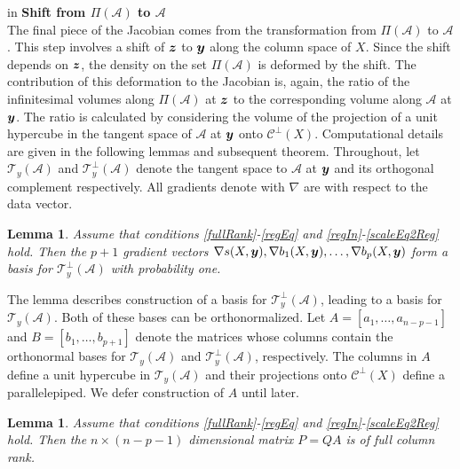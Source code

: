 \documentclass[12pt]{article}
\newcommand{\by}{\mbox{\boldmath $y$}}
\newcommand{\bz}{\mbox{\boldmath $z$}}
\newcommand{\mc}{\mathcal}
\newtheorem{lemma}[theorem]{\bf Lemma}
\begin{document}
 in
\noindent
{\bf Shift from $\Pi(\mathcal{A})$ to $\mathcal{A}$} \\
The final piece of the Jacobian comes from the transformation from
$\Pi(\mathcal{A})$ to $\mathcal{A}$.  %
This step involves a shift of
$\bz$ to $\by$ along the column space of $X$. Since the shift depends on 
$\bz$, the density on the set 
$\Pi(\mathcal{A})$ is deformed by the shift. The
contribution of this deformation to the Jacobian is, again,
the ratio of the infinitesimal volumes along $\Pi(\mathcal{A})$ at $\bz$ to the
corresponding volume along $\mathcal{A}$ at $\by$. 
The ratio is calculated by considering the volume of the
projection of a unit hypercube in the tangent space of $\mathcal{A}$
at $\by$ onto $\mc{C}^\perp(X)$.
Computational details are
given in the following lemmas and subsequent theorem. Throughout, let
$\mc T_{y}(\mc A)$ and $\mc T_{y}^{\perp}(\mc A)$ denote the tangent
space to $\mc A$ at $\by$ and its orthogonal complement respectively. All gradients denote with $\nabla$ are with respect to the data vector.
\begin{lemma}
\label{lem:basis}
Assume that conditions \ref{fullRank}-\ref{regEq} and \ref{regIn}-\ref{scaleEq2Reg} hold.  Then the $p+1$ gradient vectors 
$\nabla s(X,\by), \nabla b_1(X,\by),\dots, \nabla b_p(X,\by)$ form a
basis for $\mc T_{y}^\perp(\mc A)$ with probability one.
\end{lemma}

The lemma describes construction of a basis for $\mc T_{y}^\perp(\mc A)$, leading to a 
basis for $\mc T_{y}(\mc A)$.  Both of these bases can be orthonormalized.  
Let $A=[a_{1},\dots,a_{n-p-1}]$  and $B=[b_1,\dots,b_{p+1}]$ denote the 
matrices whose columns contain the orthonormal bases for  $\mc T_{y}(\mc A)$ and  $\mc T^{\perp}_{y}(\mc A)$, respectively.  
The columns in $A$ define a unit hypercube in $\mc T_{y}(\mc
  A)$ and their projections onto $\mc{C}^\perp(X)$ define a parallelepiped.
We defer construction of $A$ until later. 

\begin{lemma}
\label{lem:fullrank}
Assume that conditions \ref{fullRank}-\ref{regEq} and \ref{regIn}-\ref{scaleEq2Reg} hold.  
Then the $n\times (n-p-1)$ dimensional matrix $P=QA$ is of full column rank.
\end{lemma}
\end{document}
